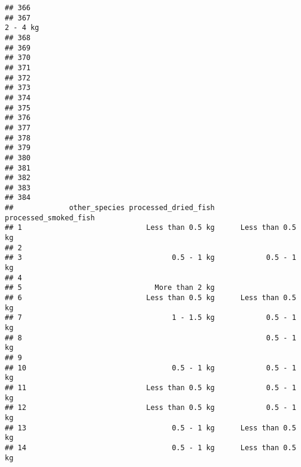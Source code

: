 \documentclass[
]{article}
\begin{document}
\begin{verbatim}
## 366                                                                            
## 367                                                                    2 - 4 kg
## 368                                                                            
## 369                                                                            
## 370                                                                            
## 371                                                                            
## 372                                                                            
## 373                                                                            
## 374                                                                            
## 375                                                                            
## 376                                                                            
## 377                                                                            
## 378                                                                            
## 379                                                                            
## 380                                                                            
## 381                                                                            
## 382                                                                            
## 383                                                                            
## 384                                                                            
##             other_species processed_dried_fish processed_smoked_fish
## 1                             Less than 0.5 kg      Less than 0.5 kg
## 2                                                                   
## 3                                   0.5 - 1 kg            0.5 - 1 kg
## 4                                                                   
## 5                               More than 2 kg                      
## 6                             Less than 0.5 kg      Less than 0.5 kg
## 7                                   1 - 1.5 kg            0.5 - 1 kg
## 8                                                         0.5 - 1 kg
## 9                                                                   
## 10                                  0.5 - 1 kg            0.5 - 1 kg
## 11                            Less than 0.5 kg            0.5 - 1 kg
## 12                            Less than 0.5 kg            0.5 - 1 kg
## 13                                  0.5 - 1 kg      Less than 0.5 kg
## 14                                  0.5 - 1 kg      Less than 0.5 kg

\end{verbatim}
\end{document}
